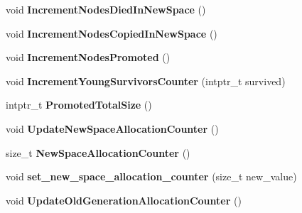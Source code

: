 \begin{DoxyCompactItemize}
\item 
void {\bfseries Increment\+Nodes\+Died\+In\+New\+Space} ()\hypertarget{classv8_1_1internal_1_1_heap_adf919835107621c5207dfa87fc8e581a}{}\label{classv8_1_1internal_1_1_heap_adf919835107621c5207dfa87fc8e581a}

\item 
void {\bfseries Increment\+Nodes\+Copied\+In\+New\+Space} ()\hypertarget{classv8_1_1internal_1_1_heap_ab8562ed80bf7424cf2fef655d7b59111}{}\label{classv8_1_1internal_1_1_heap_ab8562ed80bf7424cf2fef655d7b59111}

\item 
void {\bfseries Increment\+Nodes\+Promoted} ()\hypertarget{classv8_1_1internal_1_1_heap_add48857c6d6d457ce91050e255695e3c}{}\label{classv8_1_1internal_1_1_heap_add48857c6d6d457ce91050e255695e3c}

\item 
void {\bfseries Increment\+Young\+Survivors\+Counter} (intptr\+\_\+t survived)\hypertarget{classv8_1_1internal_1_1_heap_ad711ded39e953fdc51b0bb9f8e3371f0}{}\label{classv8_1_1internal_1_1_heap_ad711ded39e953fdc51b0bb9f8e3371f0}

\item 
intptr\+\_\+t {\bfseries Promoted\+Total\+Size} ()\hypertarget{classv8_1_1internal_1_1_heap_aa699db2fbfaf6f6e633801039e818ad6}{}\label{classv8_1_1internal_1_1_heap_aa699db2fbfaf6f6e633801039e818ad6}

\item 
void {\bfseries Update\+New\+Space\+Allocation\+Counter} ()\hypertarget{classv8_1_1internal_1_1_heap_a08496175139e9667402ed81d61c8501a}{}\label{classv8_1_1internal_1_1_heap_a08496175139e9667402ed81d61c8501a}

\item 
size\+\_\+t {\bfseries New\+Space\+Allocation\+Counter} ()\hypertarget{classv8_1_1internal_1_1_heap_a4b7bd06c030940031cdb400bf1de11d2}{}\label{classv8_1_1internal_1_1_heap_a4b7bd06c030940031cdb400bf1de11d2}

\item 
void {\bfseries set\+\_\+new\+\_\+space\+\_\+allocation\+\_\+counter} (size\+\_\+t new\+\_\+value)\hypertarget{classv8_1_1internal_1_1_heap_a792ed2505ef1006bf4f8c98bec232309}{}\label{classv8_1_1internal_1_1_heap_a792ed2505ef1006bf4f8c98bec232309}

\item 
void {\bfseries Update\+Old\+Generation\+Allocation\+Counter} ()\hypertarget{classv8_1_1internal_1_1_heap_ad8bd4507a94a87491852a11476c53569}{}\label{classv8_1_1internal_1_1_heap_ad8bd4507a94a87491852a11476c53569}


\end{DoxyCompactItemize}
